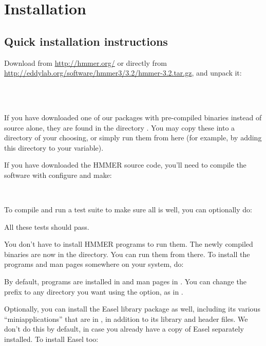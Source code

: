 \section{Installation}
\label{section:installation}
\setcounter{footnote}{0}

\subsection{Quick installation instructions}

Download  from \url{http://hmmer.org/}
or directly from 
\url{http://eddylab.org/software/hmmer3/3.2/hmmer-3.2.tar.gz}, and
unpack it:

\\
\\

If you have downloaded one of our packages with pre-compiled binaries
instead of source alone, they are found in the directory
. You may copy these into a directory of your
choosing, or simply run them from here (for example, by adding this
directory to your  variable).

If you have downloaded the HMMER source code, you'll need to compile the software
with configure and make:

\\ 

To compile and run a test suite to make sure all is well, you can
optionally do:


All these tests should pass.

You don't have to install HMMER programs to run them. The newly
compiled binaries are now in the  directory. You can run
them from there. To install the programs and man pages somewhere on
your system, do:


By default, programs are installed in  and man
pages in . You can change the
 prefix to any directory you want using the
 option, as in .

Optionally, you can install the Easel library package as well,
including its various ``miniapplications'' that are in
, in addition to its library and header files. We
don't do this by default, in case you already have a copy of Easel
separately installed. To install Easel too:

